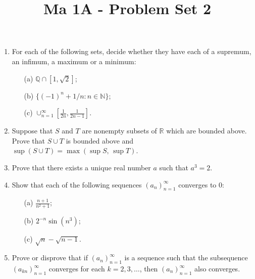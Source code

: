 \documentclass[11pt]{article}
\title{\vspace{-0.7cm}Ma 1A - Problem Set 2}
\date{}
\begin{document}
\maketitle

\begin{enumerate}

\item
For each of the following sets, decide whether they have each of a supremum, an infimum, a maximum or a minimum:
\begin{itemize}
\item[(a)] $\mathbb{Q} \cap [1, \sqrt{2}]$;
\item[(b)] $\{(-1)^n + 1/n : n \in \mathbb{N}\}$;
\item[(c)] $\cup_{n=1}^\infty [\frac{1}{2n}, \frac{1}{2n-1}]$.
\end{itemize}

\item
Suppose that $S$ and $T$ are nonempty subsets of $\mathbb{R}$ which are bounded above. Prove that $S \cup T$ is bounded above and $\sup (S\cup T) = \max(\sup S, \, \sup T)$.

\item
Prove that there exists a unique real number $a$ such that $a^3 = 2$.

\item
Show that each of the following sequences $(a_n)_{n=1}^\infty$ converges to $0$:
\begin{itemize}
\item[(a)] $\frac{n+1}{n^2 + 1}$;
\item[(b)] $2^{-n} \sin(n^3)$;
\item[(c)] $\sqrt{n} - \sqrt{n-1}$.
\end{itemize}


\item
Prove or disprove that if $(a_n)_{n=1}^\infty$ is a sequence such that the subsequence $(a_{kn})_{n=1}^\infty$ converges for each $k = 2, 3, \dots$, then $(a_n)_{n=1}^\infty$ also converges.

\end{enumerate}
\end{document}
